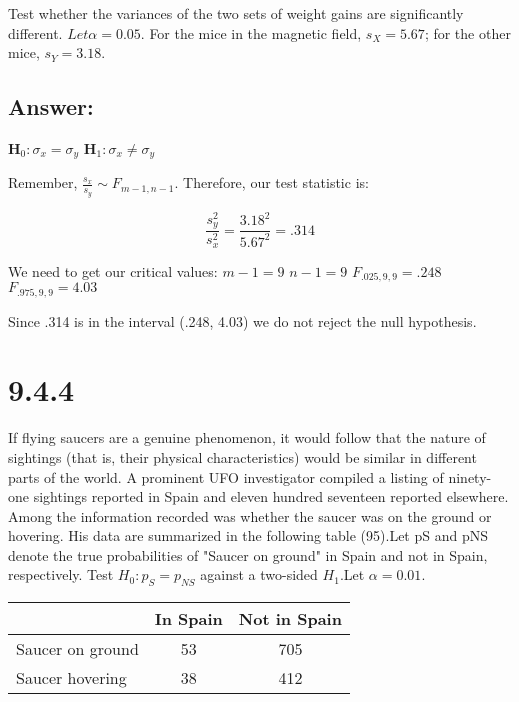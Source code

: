 \documentclass[svgnames]{article}
\begin{document}
Test whether the variances of the two sets of weight gains are significantly different. $Let \alpha = 0.05$. For the mice in the magnetic field, $s_X = 5.67$; for the other mice, $s_Y = 3.18$.

\subsection*{Answer:}
\textbf{H$_0: \sigma_x = \sigma_{y} $}
\newline
\textbf{H$_1: \sigma_x \neq \sigma_{y} $}
\newline

Remember, $\frac{s_x}{s_y} \sim F_{m-1,n-1}$.\newline
Therefore, our test statistic is:

$$\frac{s_y^2}{s_x^2}=\frac{3.18^2}{5.67^2}=.314$$

We need to get our critical values:
$m-1=9$\newline
$ n-1=9$\newline
$F_{.025,9,9}=.248$\newline
$F_{.975,9,9}=4.03$\newline

Since .314 is in the interval (.248, 4.03) we do not reject the null hypothesis. 


\section{9.4.4}

If flying saucers are a genuine phenomenon, it would follow that the nature of sightings (that is, their physical characteristics) would be similar in different parts of the world. A prominent UFO investigator compiled a listing of ninety-one sightings reported in Spain and eleven hundred seventeen reported elsewhere. Among the information recorded was whether the saucer was on the ground or hovering. His data are summarized in the following table (95).Let pS and pNS denote the true probabilities of "Saucer on ground" in Spain and not in Spain, respectively. Test $H_0: p_S = p_{NS}$ against a two-sided $H_1$.Let $\alpha = 0.01$.


\begin{table}[H]
\centering
 \begin{tabular}{l c c} 
 \hline
\bf   & \bf  In Spain & \bf  Not in Spain \\
\hline
Saucer on ground & 53  & 705 \\
Saucer hovering &  38  & 412  \\
 \hline
 \end{tabular}
\end{table}
\end{document}
